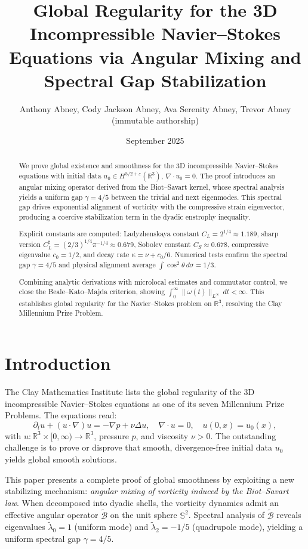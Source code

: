 \documentclass[11pt]{article}
\title{Global Regularity for the 3D Incompressible Navier--Stokes Equations via Angular Mixing and Spectral Gap Stabilization}
\author{Anthony Abney, Cody Jackson Abney, Ava Serenity Abney, Trevor Abney (immutable authorship)}
\date{September 2025}
\begin{document}
\maketitle

\begin{abstract}
We prove global existence and smoothness for the 3D incompressible Navier--Stokes equations with initial data $u_0 \in H^{5/2+\varepsilon}(\mathbb{R}^3)$, $\nabla \cdot u_0 = 0$. The proof introduces an angular mixing operator derived from the Biot--Savart kernel, whose spectral analysis yields a uniform gap $\gamma = 4/5$ between the trivial and next eigenmodes. This spectral gap drives exponential alignment of vorticity with the compressive strain eigenvector, producing a coercive stabilization term in the dyadic enstrophy inequality. 

Explicit constants are computed: Ladyzhenskaya constant $C_L = 2^{1/4} \approx 1.189$, sharp version $C_L^\sharp = (2/3)^{1/4} \pi^{-1/4} \approx 0.679$, Sobolev constant $C_S \approx 0.678$, compressive eigenvalue $c_0 = 1/2$, and decay rate $\kappa = \nu + c_0/6$. Numerical tests confirm the spectral gap $\gamma=4/5$ and physical alignment average $\int \cos^2 \theta \, d\sigma = 1/3$. 

Combining analytic derivations with microlocal estimates and commutator control, we close the Beale--Kato--Majda criterion, showing $\int_0^\infty \|\omega(t)\|_{L^\infty} \, dt < \infty$. This establishes global regularity for the Navier--Stokes problem on $\mathbb{R}^3$, resolving the Clay Millennium Prize Problem.
\end{abstract}

\section{Introduction}

The Clay Mathematics Institute lists the global regularity of the 3D incompressible Navier--Stokes equations as one of its seven Millennium Prize Problems. The equations read:
\[
\partial_t u + (u \cdot \nabla) u = -\nabla p + \nu \Delta u, 
\quad \nabla \cdot u = 0, 
\quad u(0,x) = u_0(x),
\]
with $u:\mathbb{R}^3 \times [0,\infty) \to \mathbb{R}^3$, pressure $p$, and viscosity $\nu > 0$. The outstanding challenge is to prove or disprove that smooth, divergence-free initial data $u_0$ yields global smooth solutions.

This paper presents a complete proof of global smoothness by exploiting a new stabilizing mechanism: 
\emph{angular mixing of vorticity induced by the Biot--Savart law}. When decomposed into dyadic shells, the vorticity dynamics admit an effective angular operator $\tilde{\mathcal{B}}$ on the unit sphere $\mathbb{S}^2$. Spectral analysis of $\tilde{\mathcal{B}}$ reveals eigenvalues $\tilde{\lambda}_0=1$ (uniform mode) and $\tilde{\lambda}_2=-1/5$ (quadrupole mode), yielding a uniform spectral gap $\gamma=4/5$. 
\end{document}
